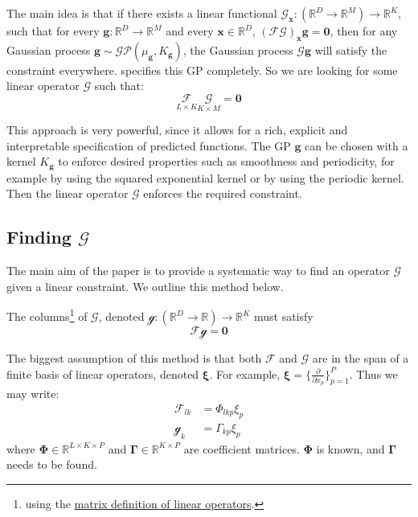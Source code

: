 \documentclass[12pt,a4paper,twoside]{report}
\theoremstyle{definition}
\newcommand{\g}{\mathscr G_\mathbf x}
\begin{document}
The main idea is that if there exists a linear functional $\g:(\mathbb{R}^{D}\to\mathbb{R}^M)\to \mathbb{R}^K$, such that for every $\mathbf g:\mathbb{R}^D\to\mathbb{R}^M$ and every $\mathbf x\in \mathbb{R}^D$, $(\mathscr F\mathscr G)_\mathbf x\mathbf g=\mathbf 0$, then for any Gaussian process $\mathbf g\sim \mathcal {GP}(\mu_\mathbf g, K_\mathbf g)$, the Gaussian process $\mathscr G\mathbf g$ will satisfy the constraint everywhere.  specifies this GP completely. So we are looking for some linear operator $\mathscr G$ such that:
\begin{equation}\label{constraint}
	\underset{L\times K}{\mathscr F}\underset{K\times M}{\mathscr G}=\mathbf 0
\end{equation}

This approach is very powerful, since it allows for a rich, explicit and interpretable specification of predicted functions.
The GP $\mathbf g$ can be chosen with a kernel $K_\mathbf g$ to enforce desired properties such as smoothness and periodicity, for example by using the squared exponential kernel or by using the periodic kernel. Then the linear operator $\mathscr G$ enforces the required constraint.

\subsection{\texorpdfstring{Finding $\mathscr G$}{Finding the operator G}}\label{findingG}
The main aim of the paper is to provide a systematic way to find an operator $\mathscr G$ given a linear constraint. We outline this method below.

The columns\footnote{using the \hyperref[matrix]{matrix definition of linear operators}.} of $\mathscr G$, denoted $\mathscr g:(\mathbb{R}^D\to\mathbb{R})\to\mathbb{R}^K$ must satisfy 
\begin{equation}\label{Fg0}
	\mathscr F \mathscr g = \mathbf 0
\end{equation}

The biggest assumption of this method is that both $\mathscr{F}$ and $\mathscr G$ are in the span of a finite basis of linear operators, denoted $\boldsymbol \xi$. For example, $\boldsymbol \xi = \{\frac{\partial}{\partial x_p}\}_{p=1}^P$. Thus we may write:
\begin{align*}
	\mathscr F_{lk} &= \Phi_{lkp} \xi_p\\
	\mathscr g_k &= \Gamma_{kp} \xi_{p}
\end{align*}
where $\boldsymbol \Phi \in \mathbb{R}^{L\times K\times P}$ and $\boldsymbol \Gamma \in \mathbb{R}^{K\times P}$ are coefficient matrices. $\boldsymbol \Phi$ is known, and $\boldsymbol \Gamma$ needs to be found.
\end{document}

